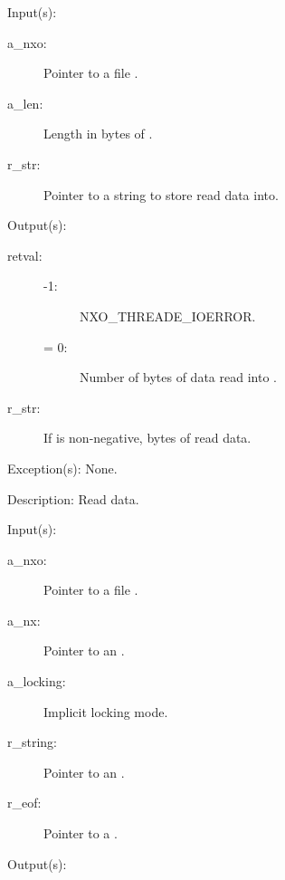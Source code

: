 \begin{capi}
\begin{capilist}
	\item[Input(s): ]
		\begin{description}\item[]
		\item[a\_nxo: ]
			Pointer to a file .
		\item[a\_len: ]
			Length in bytes of .
		\item[r\_str: ]
			Pointer to a string to store read data into.
		\end{description}
	\item[Output(s): ]
		\begin{description}\item[]
		\item[retval: ]
			\begin{description}\item[]
			\item[-1: ]
				{NXO_THREADE_IOERROR}.
			\item[{\gt}= 0: ]
				Number of bytes of data read into .
			\end{description}\item[]
		\item[r\_str: ]
			If  is non-negative,  bytes of
			read data.
		\end{description}
	\item[Exception(s): ] None.
	\item[Description: ]
		Read data.
	\end{capilist}
\label{nxo_file_readline}
	\begin{capilist}
	\item[Input(s): ]
		\begin{description}\item[]
		\item[a\_nxo: ]
			Pointer to a file .
		\item[a\_nx: ]
			Pointer to an .
		\item[a\_locking: ]
			Implicit locking mode.
		\item[r\_string: ]
			Pointer to an .
		\item[r\_eof: ]
			Pointer to a .
		\end{description}
	\item[Output(s): ]

\end{capilist}
\end{capi}
